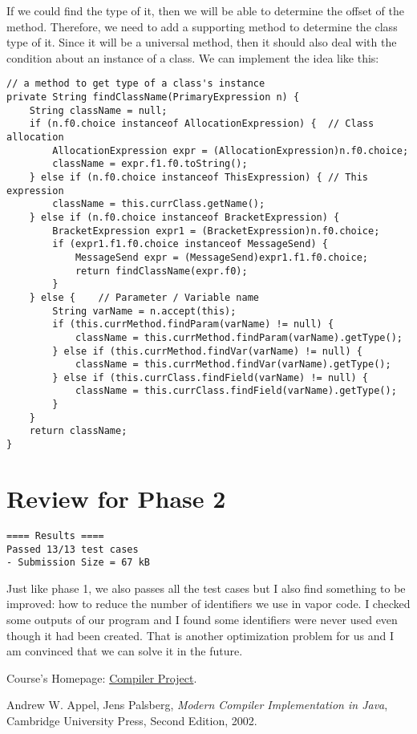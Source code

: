 \documentclass[letterpaper, 14pt]{article}
\begin{document}
If we could find the type of it, then we will be able to determine the offset of the method. Therefore, we need to add a supporting method to determine the class type of it. Since it will be a universal method, then it should also deal with the condition about an instance of a class. We can implement the idea like this:
\begin{lstlisting}
// a method to get type of a class's instance
private String findClassName(PrimaryExpression n) {
	String className = null;
	if (n.f0.choice instanceof AllocationExpression) {	// Class allocation
		AllocationExpression expr = (AllocationExpression)n.f0.choice;
		className = expr.f1.f0.toString();
	} else if (n.f0.choice instanceof ThisExpression) {	// This expression
		className = this.currClass.getName();
	} else if (n.f0.choice instanceof BracketExpression) {
		BracketExpression expr1 = (BracketExpression)n.f0.choice;
		if (expr1.f1.f0.choice instanceof MessageSend) {
			MessageSend expr = (MessageSend)expr1.f1.f0.choice;
			return findClassName(expr.f0);
		}
	} else {	// Parameter / Variable name
		String varName = n.accept(this);
		if (this.currMethod.findParam(varName) != null) {
			className = this.currMethod.findParam(varName).getType();
		} else if (this.currMethod.findVar(varName) != null) {
			className = this.currMethod.findVar(varName).getType();
		} else if (this.currClass.findField(varName) != null) {
			className = this.currClass.findField(varName).getType();
		}
	}
	return className;
}
\end{lstlisting}

\section{Review for Phase 2}

\begin{lstlisting}
==== Results ====
Passed 13/13 test cases
- Submission Size = 67 kB
\end{lstlisting}

Just like phase 1, we also passes all the test cases but I also find something to be improved: how to reduce the number of identifiers we use in vapor code. I checked some outputs of our program and I found some identifiers were never used even though it had been created. That is another optimization problem for us and I am convinced that we can solve it in the future. 

\begin{thebibliography}{9}

	Course's Homepage: 
	\href{https://www.cs.ucr.edu/~lesani/teaching/cp/cp.html}{Compiler Project}. 

	Andrew W. Appel, Jens Palsberg, 
	\textit{Modern Compiler Implementation in Java},
	Cambridge University Press, 
	Second Edition, 
	2002. 

\end{thebibliography}
\end{document}
